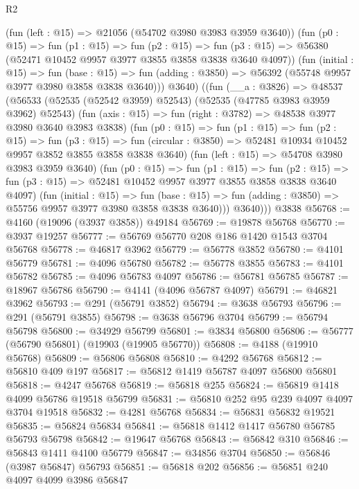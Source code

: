 \begin{lexlean}{R2}
\begin{coremodule}
          (fun (left : @15) => @21056 (@54702 @3980 @3983 @3959 @3640))
          (fun (p0 : @15) =>
          fun (p1 : @15) =>
          fun (p2 : @15) =>
          fun (p3 : @15) => @56380 (@52471 @10452 @9957 @3977 @3855 @3858 @3838 @3640 @4097))
          (fun (initial : @15) =>
          fun (base : @15) =>
          fun (adding : @3850) => @56392 (@55748 @9957 @3977 @3980 @3858 @3838 @3640)))
          @3640)
        ((fun (__a : @3826) =>
        @48537
          (@56533
            (@52535 (@52542 @3959) @52543)
            (@52535 (@47785 @3983 @3959 @3962) @52543)
            (fun (axis : @15) => fun (right : @3782) => @48538 @3977 @3980 @3640 @3983 @3838)
            (fun (p0 : @15) =>
            fun (p1 : @15) =>
            fun (p2 : @15) =>
            fun (p3 : @15) =>
            fun (circular : @3850) => @52481 @10934 @10452 @9957 @3852 @3855 @3858 @3838 @3640)
            (fun (left : @15) => @54708 @3980 @3983 @3959 @3640)
            (fun (p0 : @15) =>
            fun (p1 : @15) =>
            fun (p2 : @15) =>
            fun (p3 : @15) => @52481 @10452 @9957 @3977 @3855 @3858 @3838 @3640 @4097)
            (fun (initial : @15) =>
            fun (base : @15) =>
            fun (adding : @3850) => @55756 @9957 @3977 @3980 @3858 @3838 @3640)))
          @3640)))
    @3838
@56768 := @4160 (@19096 (@3937 @3858)) @49184
@56769 := @19878 @56768
@56770 := @3937 @19257
@56777 := @56769 @56770 @208 @186 @1420 @1543 @3704 @56768
@56778 := @46817 @3962
@56779 := @56778 @3852
@56780 := @4101 @56779
@56781 := @4096 @56780
@56782 := @56778 @3855
@56783 := @4101 @56782
@56785 := @4096 @56783 @4097
@56786 := @56781 @56785
@56787 := @18967 @56786
@56790 := @4141 (@4096 @56787 @4097)
@56791 := @46821 @3962
@56793 := @291 (@56791 @3852)
@56794 := @3638 @56793
@56796 := @291 (@56791 @3855)
@56798 := @3638 @56796 @3704
@56799 := @56794 @56798
@56800 := @34929 @56799
@56801 := @3834 @56800
@56806 := @56777 (@56790 @56801) (@19903 (@19905 @56770))
@56808 := @4188 (@19910 @56768)
@56809 := @56806 @56808
@56810 := @4292 @56768
@56812 := @56810 @409 @197
@56817 := @56812 @1419 @56787 @4097 @56800 @56801
@56818 := @4247 @56768
@56819 := @56818 @255
@56824 := @56819 @1418 @4099 @56786 @19518 @56799
@56831 := @56810 @252 @95 @239 @4097 @4097 @3704 @19518
@56832 := @4281 @56768
@56834 := @56831 @56832 @19521
@56835 := @56824 @56834
@56841 := @56818 @1412 @1417 @56780 @56785 @56793 @56798
@56842 := @19647 @56768
@56843 := @56842 @310
@56846 := @56843 @1411 @4100 @56779
@56847 := @34856 @3704
@56850 := @56846 (@3987 @56847) @56793
@56851 := @56818 @202
@56856 := @56851 @240 @4097 @4099 @3986 @56847

\end{coremodule}
\end{lexlean}
